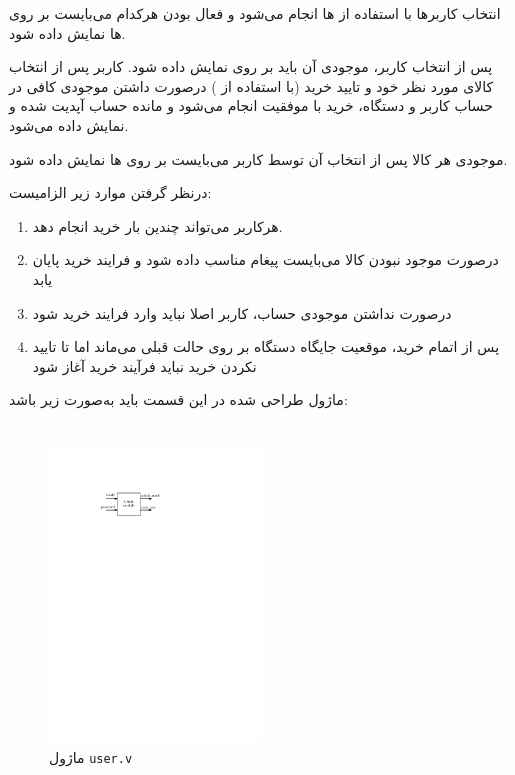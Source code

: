\documentclass[]{article}
\begin{document}
انتخاب کاربر‌ها با استفاده از  ها انجام می‌شود و فعال بودن هرکدام می‌بایست بر روی  ها نمایش داده شود.

پس از انتخاب کاربر، موجودی آن باید بر روی  نمایش داده شود. کاربر پس از انتخاب کالای مورد نظر خود و تایید خرید (با استفاده از ) درصورت داشتن موجودی کافی در حساب کاربر و دستگاه، خرید با موفقیت انجام می‌شود و مانده حساب آپدیت شده و نمایش داده می‌شود.

موجودی هر کالا پس از انتخاب آن توسط کاربر می‌بایست بر روی  ها نمایش داده شود.

درنظر گرفتن موارد زیر الزامیست:

\begin{enumerate}
	\item هرکاربر می‌تواند چندین بار خرید انجام دهد.
	\item درصورت موجود نبودن کالا می‌بایست پیغام مناسب داده شود و فرایند خرید پایان یابد
	\item درصورت نداشتن موجودی حساب، کاربر اصلا نباید وارد فرایند خرید شود
	\item پس از اتمام خرید، موقعیت جایگاه دستگاه بر روی حالت قبلی می‌ماند اما تا تایید نکردن خرید نباید فرآیند خرید آغاز شود
\end{enumerate}



ماژول طراحی شده در این قسمت باید به‌صورت زیر باشد:
\newpage
\Large \textbf{\\\\
}

\begin{figure}[h]
	\centering
	\includegraphics[width=0.5\textwidth]{images/admin.pdf}
	\caption{ماژول \texttt{user.v}}
	\label{ماژول user.v}
\end{figure}
\end{document}

